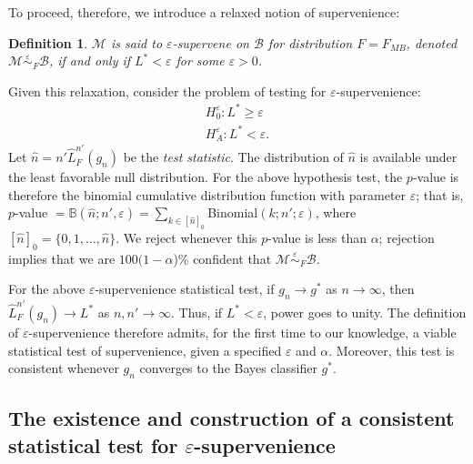 \documentclass{article}
\newcommand{\conv}{\rightarrow}
\newcommand{\mB}{\mathcal{B}}
\newcommand{\mM}{\mathcal{M}}
\newcommand{\eps}{\varepsilon}
\providecommand{\mc}[1]{\mathcal{#1}}
\providecommand{\mh}[1]{\widehat{#1}}
\newcommand{\hL}{\widehat{L}}
\newcommand{\MeB}{\mM \overset{\varepsilon}{{\sim}}_{F} \mB}
\newtheorem{defi}{Definition}
\begin{document}
To proceed, therefore, we introduce a relaxed notion of supervenience: 
\begin{defi}
\label{def:2}
$\mM$ is said to $\eps$-\textit{supervene} on $\mB$ for distribution $F=F_{MB}$, denoted $\MeB$, if and only if $L^*< \eps$ for some $\eps>0$.
\end{defi}
\noindent 
Given this relaxation, consider the problem of testing for $\eps$-supervenience:
\begin{align*}
	H_0^{\eps}: L^* \geq \eps \\
	H_A^{\eps}: L^* < \eps.
\end{align*}
Let $\mh{n}= n' \hL^{n'}_{F}(g_n)$ be the \emph{test statistic}. 
The distribution of $\mh{n}$ is available under the least favorable null distribution. 
For the above hypothesis test,  
the $p$-value is therefore the binomial cumulative distribution function with parameter $\eps$; that is, $p$-value $=\mathbb{B}(\mh{n}; n', \eps)= \sum_{k \in [\mh{n}]_0}$Binomial$(k; n'; \eps)$, where
$[\mh{n}]_0=\{0,1,\ldots, \mh{n}\}$.  We reject whenever this $p$-value is less than $\alpha$; rejection implies that we are $100(1-\alpha$)\% confident that $\MeB$.   

 For the above $\eps$-supervenience statistical test, if $g_n \conv g^*$ as $n \conv \infty$, then $\hL^{n'}_F(g_n) \conv L^*$ as $n,n' \conv \infty$.  Thus, if $L^* < \eps$, 
power goes to unity.
The definition of $\eps$-supervenience therefore admits, for the first time to our knowledge, a viable statistical test of supervenience, given a specified $\eps$ and $\alpha$. Moreover, this test is consistent whenever $g_n$ converges to the Bayes classifier $g^*$.





\subsection*{The existence and construction of a consistent statistical test for $\eps$-supervenience} %
\label{sub:uc}
\end{document}
